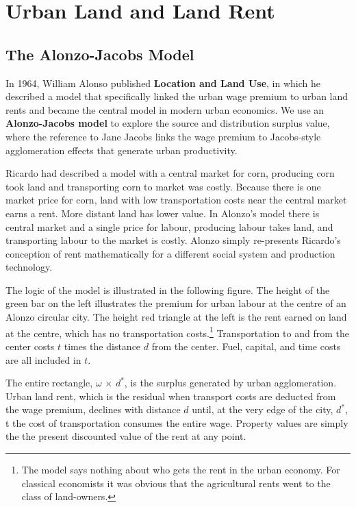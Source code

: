 

\chapter{Urban Land and Land Rent}
\section{The Alonzo-Jacobs Model}
In 1964, William Alonso published \textbf{Location and Land Use}, in which he described a model that specifically linked the urban wage premium to urban land rents and  became the central model in modern urban economics. 
We use an \textbf{Alonzo-Jacobs model} to explore the source and distribution surplus value, where the reference to Jane Jacobs links the wage premium to Jacobs-style  agglomeration effects that generate urban productivity.%

Ricardo had described a model with a central market for corn, producing corn took land and transporting corn to market was costly. Because there is one market price for corn, land with low transportation costs near the central market earns a rent. More distant land has lower value. In Alonzo's model there is central market and a single price for labour, producing labour takes land, and transporting labour to the market is costly. Alonzo simply re-presents Ricardo's conception of rent  mathematically for a different social system and production technology.  

The logic of the model is illustrated in the following figure. The height of the green bar on the left illustrates the premium for urban labour at the centre of an Alonzo circular city. The height red triangle at the left is the rent earned on land at the centre, which has no transportation costs.\footnote{The model says nothing about who gets the rent in the urban economy. For classical economists it was obvious that the agricultural rents went to the class of land-owners.} Transportation to and from the center costs $t$ times the distance $d$ from the center. Fuel, capital, and time costs are  all included in $t$. 



The entire rectangle, $\omega$ $\times$ $d^*$, is the surplus generated by urban agglomeration. Urban land rent, which is the residual when transport costs are deducted from the wage premium, declines  with distance $d$ until, at the very edge of the city, $d^*$, t the cost of transportation  consumes the entire wage. Property values are simply the the present discounted value of the rent at any point.

